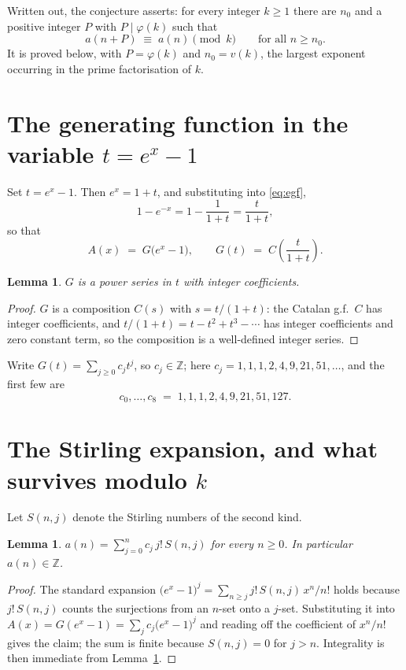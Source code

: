\documentclass[11pt,a4paper]{article}
\theoremstyle{plain}
\newtheorem{lemma}[theorem]{Lemma}
\theoremstyle{definition}
\begin{document}
Written out, the conjecture asserts: for every integer $k\ge 1$ there are $n_0$ and a
positive integer $P$ with $P\mid\varphi(k)$ such that
\begin{equation}\label{eq:conj}
a(n+P)\;\equiv\;a(n)\pmod{k}\qquad\text{for all } n\ge n_0 .
\end{equation}
It is proved below, with $P=\varphi(k)$ and $n_0=v(k)$, the largest exponent occurring in
the prime factorisation of $k$.

\section{The generating function in the variable $t=e^{x}-1$}

Set $t=e^{x}-1$. Then $e^{x}=1+t$, and substituting into \eqref{eq:egf},
\[
1-e^{-x}=1-\frac{1}{1+t}=\frac{t}{1+t},
\]
so that
\begin{equation}\label{eq:G}
A(x)\;=\;G\bigl(e^{x}-1\bigr),\qquad
G(t)\;=\;C\!\left(\frac{t}{1+t}\right).
\end{equation}

\begin{lemma}\label{lem:int}
$G$ is a power series in $t$ with integer coefficients.
\end{lemma}

\begin{proof}
$G$ is a composition $C(s)$ with $s=t/(1+t)$: the Catalan g.f.\ $C$ has integer coefficients, and $t/(1+t)=t-t^{2}+t^{3}-\cdots$ has integer coefficients and zero constant term, so the composition is a well-defined integer series.
\end{proof}

Write $G(t)=\sum_{j\ge0}c_j t^{j}$, so $c_j\in\mathbb{Z}$; here $c_j = 1, 1, 1, 2, 4, 9, 21, 51, \dots$, and the
first few are
\[
c_0,\dots,c_8 \;=\; 1, 1, 1, 2, 4, 9, 21, 51, 127.
\]

\section{The Stirling expansion, and what survives modulo $k$}

Let $S(n,j)$ denote the Stirling numbers of the second kind.

\begin{lemma}\label{lem:stir}
$a(n)=\sum_{j=0}^{n} c_j\, j!\, S(n,j)$ for every $n\ge 0$. In particular $a(n)\in\mathbb{Z}$.
\end{lemma}

\begin{proof}
The standard expansion $\bigl(e^{x}-1\bigr)^{j}
=\sum_{n\ge j} j!\,S(n,j)\,x^{n}/n!$ holds because $j!\,S(n,j)$ counts the surjections
from an $n$-set onto a $j$-set. Substituting it into
$A(x)=G(e^{x}-1)=\sum_j c_j\bigl(e^{x}-1\bigr)^{j}$ and reading off the coefficient of
$x^{n}/n!$ gives the claim; the sum is finite because $S(n,j)=0$ for $j>n$. Integrality is
then immediate from Lemma~\ref{lem:int}.
\end{proof}
\end{document}
